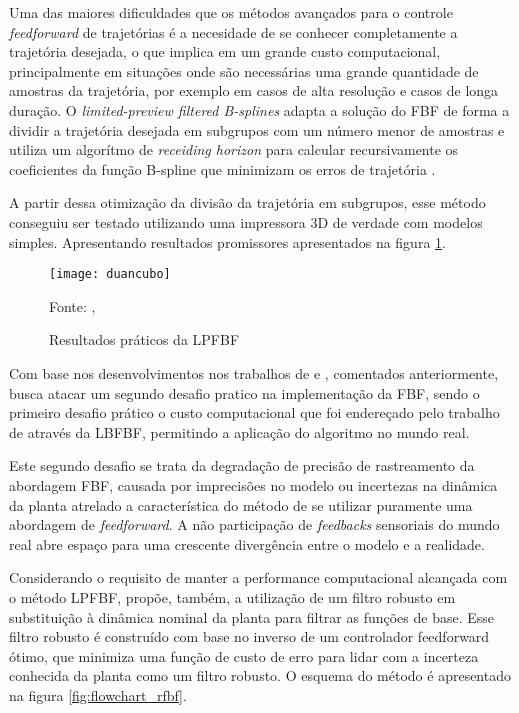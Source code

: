 Uma das maiores dificuldades que os métodos avançados para o
controle \textit{feedforward} de trajetórias é a necesidade de se conhecer
completamente a trajetória desejada, o que implica em um grande custo
computacional, principalmente em situações onde são necessárias uma
grande quantidade de amostras da trajetória, por exemplo em casos de alta resolução
e casos de longa duração.
O \textit{limited-preview filtered B-splines} adapta a solução do FBF de forma a dividir a 
trajetória desejada em subgrupos com um número menor de amostras e utiliza um algorítmo de 
\textit{receiding horizon} para calcular recursivamente os coeficientes da função B-spline que 
minimizam os erros de trajetória \cite{duan18}.

A partir dessa otimização da divisão da trajetória em subgrupos, esse método
conseguiu ser testado utilizando uma impressora 3D de verdade com modelos simples.
Apresentando resultados promissores apresentados na figura \ref{fig:duancubo}.

\begin{figure}[!htb]
    \centering
    \caption{Resultados práticos da LPFBF}
    \texttt{[image: duancubo]}

    {\footnotesize Fonte: \citeauthor{duan18}, \citeyear{duan18}}
    \label{fig:duancubo}
\end{figure}

Com base nos desenvolvimentos nos trabalhos de \cite{ramani17} e \cite{duan18}, comentados anteriormente, 
\cite{ramani20} busca atacar um segundo desafio pratico na implementação da FBF, sendo o primeiro desafio prático
o custo computacional que foi endereçado pelo trabalho de \cite{duan18} através da LBFBF, permitindo a aplicação
do algoritmo no mundo real.

Este segundo desafio se trata da degradação de precisão de rastreamento da abordagem FBF, causada por
imprecisões no modelo ou incertezas na dinâmica da planta atrelado a característica do método de se
utilizar puramente uma abordagem de \textit{feedforward}. A não participação de \textit{feedbacks} sensoriais
do mundo real abre espaço para uma crescente divergência entre o modelo e a realidade.

Considerando o requisito de manter a performance computacional alcançada com o método LPFBF, \cite{ramani20} 
propõe, também, a utilização de um filtro robusto em substituição à dinâmica nominal da planta para 
filtrar as funções de base. Esse filtro robusto é construído com base no inverso de um controlador 
feedforward ótimo, que minimiza uma função de custo de erro para lidar com a incerteza conhecida da planta 
como um filtro robusto.
O esquema do método é apresentado na figura \ref{fig:flowchart_rfbf}.

